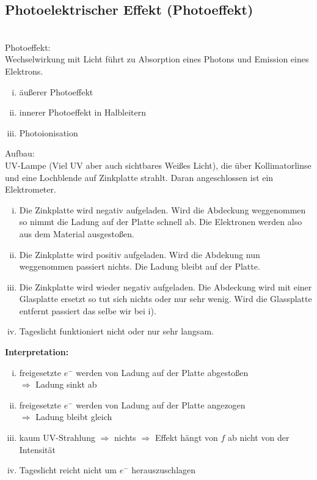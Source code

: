 \subsection{Photoelektrischer Effekt (Photoeffekt)}
\\
Photoeffekt:\\
Wechselwirkung mit Licht führt zu Absorption eines Photons und Emission eines Elektrons.
\begin{enumerate}[i)]
	\item äußerer Photoeffekt
	\item innerer Photoeffekt in Halbleitern
	\item Photoionisation
\end{enumerate}
Aufbau:\\
UV-Lampe (Viel UV aber auch sichtbares Weißes Licht), die über Kollimatorlinse und eine Lochblende auf Zinkplatte strahlt. Daran angeschlossen ist ein Elektrometer.\\[5pt]
\begin{enumerate}[i)]
	\item Die Zinkplatte wird negativ aufgeladen. Wird die Abdeckung weggenommen so nimmt die Ladung auf der Platte schnell ab. Die Elektronen werden also aus dem Material ausgestoßen.
	\item Die Zinkplatte wird positiv aufgeladen. Wird die Abdekung nun weggenommen passiert nichts. Die Ladung bleibt auf der Platte.
	\item Die Zinkplatte wird wieder negativ aufgeladen. Die Abdeckung wird mit einer Glasplatte ersetzt so tut sich nichts oder nur sehr wenig. Wird die Glassplatte entfernt passiert das selbe wir bei i).
	\item Tageslicht funktioniert nicht oder nur sehr langsam.
\end{enumerate}
\textbf{Interpretation:}
\begin{enumerate}[i)]
	\item freigesetzte $ e^- $ werden von Ladung auf der Platte abgestoßen\\
	$ \Rightarrow $ Ladung sinkt ab
	\item freigesetzte $ e^- $ werden von Ladung auf der Platte angezogen\\
	$ \Rightarrow $ Ladung bleibt gleich
	\item kaum UV-Strahlung $ \Rightarrow $ nichts $ \Rightarrow $ Effekt hängt von $ f $ ab nicht von der Intensität
	\item Tageslicht reicht nicht um $ e^- $ herauszuschlagen
\end{enumerate}
